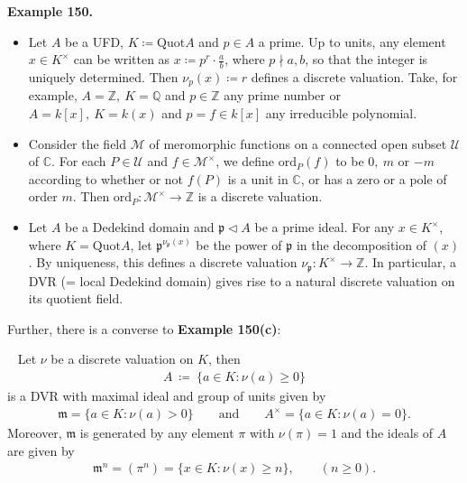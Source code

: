 \documentclass[12pt,a4paper,footinclude=true,headinclude=true]{scrbook} %
\newenvironment{proposition}[2][]
{\renewcommand\theinnercustomprop{#2}\innercustomprop[#1] 
\begin{mdframed}[backgroundcolor=gray!20]\ }
{\end{mdframed}\endinnercustomprop}
\newenvironment{example}[2][Example]
    { \begin{mdframed}[backgroundcolor=gray!20] \textbf{#1 #2.} }
    {  \end{mdframed}}
\begin{document}
\begin{example}{150}
    \begin{itemize}
        \item[(a)] Let $A$ be a UFD, $K\coloneqq\mathrm{Quot}A$ and $p\in A$ a prime. Up to units, any element $x\in K^\times$ can be written as $x\coloneqq p^r\cdot\frac{a}{b}$, where $p\nmid a,b$, so that the integer is uniquely determined. Then $\nu_p(x)\coloneqq r$ defines a discrete valuation. Take, for example, $A=\mathbb{Z},\ K=\mathbb{Q}$ and $p\in\mathbb{Z}$ any prime number or $A=k[x],\ K=k(x)$ and $p=f\in k[x]$ any irreducible polynomial.
        \item[(b)] Consider the field $\mathcal{M}$ of meromorphic functions on a connected open subset $\mathcal{U}$ of $\mathbb{C}$. For each $P\in\mathcal{U}$ and $f\in\mathcal{M}^\times$, we define $\mathrm{ord}_P(f)$ to be $0,\ m$ or $-m$ according to whether or not $f(P)$ is a unit in $\mathbb{C}$, or has a zero or a pole of order $m$. Then $\mathrm{ord}_P:\mathcal{M}^\times\to\mathbb{Z}$ is a discrete valuation.
        \item[(c)] Let $A$ be a Dedekind domain and $\mathfrak{p}\triangleleft A$ be a prime ideal. For any $x\in K^\times$, where $K=\mathrm{Quot}A$, let $\mathfrak{p}^{\nu_\mathfrak{p}(x)}$ be the power of $\mathfrak{p}$ in the decomposition of $(x)$. By uniqueness, this defines a discrete valuation $\nu_\mathfrak{p}:K^\times\to\mathbb{Z}$. In particular, a DVR (= local Dedekind domain) gives rise to a natural discrete valuation on its quotient field.
    \end{itemize}
\end{example}
\newpage
Further, there is a converse to \textbf{Example 150(c)}:
\begin{proposition}{151}
    Let $\nu$ be a discrete valuation on $K$, then 
    \begin{align*}
        A\ \coloneqq\ \{a\in K:\nu(a)\geq0\}
    \end{align*}
    is a DVR with maximal ideal and group of units given by
    \begin{align*}
        \mathfrak{m}=\{a\in K:\nu(a)>0\}\qquad\text{and}\qquad A^\times=\{a\in K:\nu(a)=0\}.
    \end{align*}
    Moreover, $\mathfrak{m}$ is generated by any element $\pi$ with $\nu(\pi)=1$ and the ideals of $A$ are given by
    \begin{align*}
        \mathfrak{m}^n=(\pi^n)=\{x\in K:\nu(x)\geq n\},\qquad (n\geq0).
    \end{align*}
\end{proposition}
\end{document}
